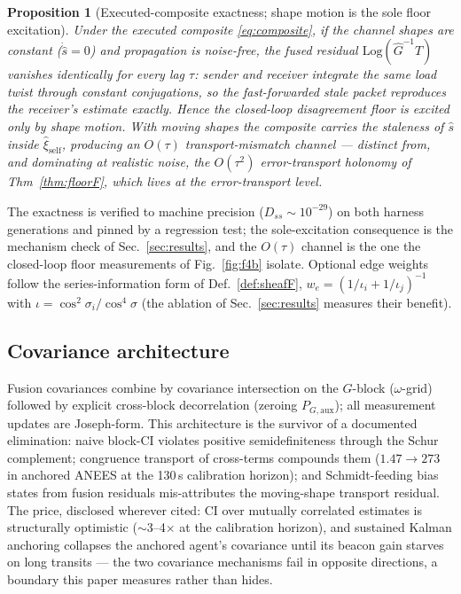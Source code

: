 \documentclass[letterpaper, 10pt, journal]{IEEEtran}
\newtheorem{proposition}{Proposition}
\begin{document}
\begin{proposition}[Executed-composite exactness; shape motion is the sole
floor excitation]\label{prop:exact}
Under the executed composite \eqref{eq:composite}, if the channel shapes are
constant ($\dot{\hat s} = 0$) and propagation is noise-free, the fused residual
$\mathrm{Log}(\hat G^{-1} T)$ vanishes identically for every lag $\tau$: sender
and receiver integrate the same load twist through constant conjugations, so the
fast-forwarded stale packet reproduces the receiver's estimate exactly. Hence
the closed-loop disagreement floor is excited \emph{only} by shape motion. With
moving shapes the composite carries the staleness of $\hat s$ inside
$\hat\xi_{\mathrm{self}}$, producing an $O(\tau)$ transport-mismatch channel ---
distinct from, and dominating at realistic noise, the $O(\tau^2)$
error-transport holonomy of Thm~\ref{thm:floorF}, which lives at the
error-transport level.
\end{proposition}
\noindent The exactness is verified to machine precision ($D_{ss} \sim
10^{-29}$) on both harness generations and pinned by a regression test; the
sole-excitation consequence is the mechanism check of Sec.~\ref{sec:results},
and the $O(\tau)$ channel is the one the closed-loop floor measurements of
Fig.~\ref{fig:f4b} isolate.
Optional edge weights follow the series-information form of Def.~\ref{def:sheafF},
$w_e = (1/\iota_i + 1/\iota_j)^{-1}$ with $\iota = \cos^2\!\sigma_i /
\cos^4\!\sigma$ (the ablation of Sec.~\ref{sec:results} measures their
benefit).

\subsection{Covariance architecture}
Fusion covariances combine by covariance intersection on the $G$-block
($\omega$-grid) followed by explicit cross-block decorrelation (zeroing
$P_{G,\mathrm{aux}}$); all measurement updates are Joseph-form. This
architecture is the survivor of a documented elimination: naive block-CI
violates positive semidefiniteness through the Schur complement; congruence
transport of cross-terms compounds them ($1.47 \to 273$ in anchored ANEES at
the 130\,s calibration horizon);
and Schmidt-feeding bias states from fusion residuals mis-attributes the
moving-shape transport residual. The price, disclosed wherever cited: CI over
mutually correlated estimates is structurally optimistic
($\sim$3--4$\times$ at the calibration horizon), and sustained Kalman
anchoring collapses the anchored agent's covariance until its beacon gain
starves on long transits --- the two covariance mechanisms fail in opposite
directions, a boundary this paper measures rather than hides.
\end{document}
